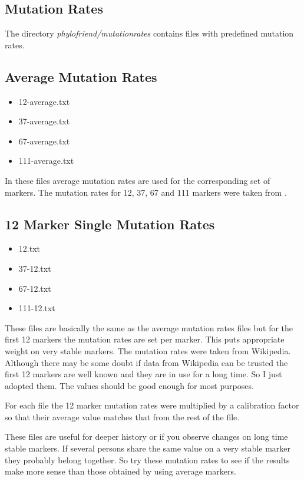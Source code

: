 \subsection{Mutation Rates}

The directory \emph{phylofriend/mutationrates} contains
files with predefined mutation rates.


\subsection*{Average Mutation Rates}

\begin{itemize}
\item 12-average.txt
\item 37-average.txt
\item 67-average.txt
\item 111-average.txt
\end{itemize}

In these files average mutation rates are used for the
corresponding set of markers. The mutation rates for 12,
37, 67 and 111 markers were taken from \cite{Kly12}.


\subsection*{12 Marker Single Mutation Rates}

\begin{itemize}
\item 12.txt
\item 37-12.txt
\item 67-12.txt
\item 111-12.txt
\end{itemize}

These files are basically the same as the average mutation
rates files but for the first 12 markers the mutation rates
are set per marker. This puts appropriate weight on
very stable markers. The mutation rates were taken from
Wikipedia\cite{Wiki-List_of_DYS_markers}. Although there
may be some doubt if data from Wikipedia can be trusted 
the first 12 markers are well known and they are in use
for a long time. So I just adopted them. The values should be
good enough for most purposes.

For each file the 12 marker mutation rates were multiplied
by a calibration factor so that their average value matches
that from the rest of the file.

These files are useful for deeper history or if you
observe changes on long time stable markers. If several
persons share the same value on a very stable marker they
probably belong together. So try these mutation rates to
see if the results make more sense than those obtained by
using average markers.


